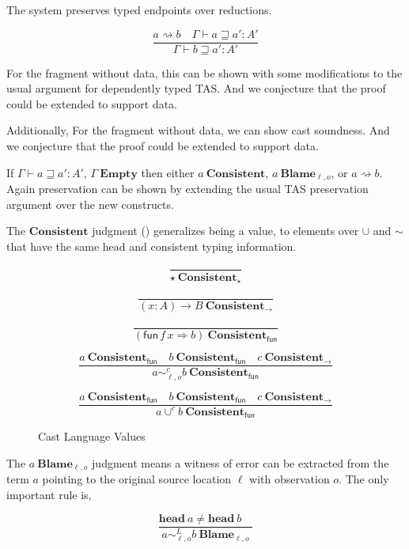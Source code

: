 The system preserves typed endpoints over reductions.
 
\[
\frac{a\rightsquigarrow b\quad\varGamma\vdash a\sqsupseteq a':A'}{\varGamma\vdash b\sqsupseteq a':A'}
\]
 
For the fragment without data, this can be shown with some modifications to the usual argument for dependently typed \ac{TAS}.
And we conjecture that the proof could be extended to support data.

Additionally, For the fragment without data, we can show cast soundness.
And we conjecture that the proof could be extended to support data.
 
If $\varGamma\vdash a\sqsupseteq a':A'$, $\varGamma\ \mathbf{Empty}$ then either $a\ \mathbf{Consistent}$, $a\ \mathbf{Blame}_{\ell,o}$, or $a\rightsquigarrow b$.
Again preservation can be shown by extending the usual \ac{TAS} preservation argument over the new constructs.



The $\mathbf{Consistent}$ judgment () generalizes being a value, to elements over $\cup$ and $\sim$ that have the same head and consistent typing information.

\begin{figure}
\[
\frac{\ }{\star\ \mathbf{Consistent_{\star}}}
\]

\[
\frac{\ }{\left(x:A\right)\rightarrow B\ \mathbf{Consistent_{\rightarrow}}}
\]

\[
\frac{\ }{\left(\mathsf{fun}\,f\,x\Rightarrow b\right)\ \mathbf{Consistent_{\mathsf{fun}}}}
\]

\[
\frac{a\ \mathbf{Consistent_{\mathsf{fun}}}\quad b\ \mathbf{Consistent_{\mathsf{fun}}}\quad c\ \mathbf{Consistent_{\rightarrow}}}{a\sim_{\ell,o}^{c}b\ \mathbf{Consistent_{\mathsf{fun}}}}
\]

\[
\frac{a\ \mathbf{Consistent_{\mathsf{fun}}}\quad b\ \mathbf{Consistent_{\mathsf{fun}}}\quad c\ \mathbf{Consistent_{\rightarrow}}}{a\cup^{c}b\ \mathbf{Consistent_{\mathsf{fun}}}}
\]
\caption{Cast Language Values}
\label{fig:cast-val}
\end{figure}


The $a\ \mathbf{Blame}_{\ell,o}$ judgment means a witness of error can be extracted from the term $a$ pointing to the original source location $\ell$ with observation $o$.
The only important rule is,

\[
\frac{\mathbf{head}\ a\neq\mathbf{head}\ b\quad}{a\sim_{\ell,o}^{L}b\ \mathbf{Blame}_{\ell,o}}
\]

